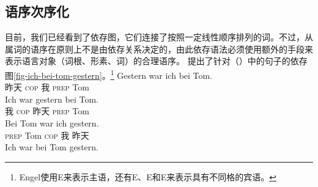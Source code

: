 \subsection{语序次序化}
\label{sec-dg-linearization}

目前，我们已经看到了依存图，它们连接了按照一定线性顺序排列的词。不过，从属词的语序在原则上不是由依存关系决定的，由此依存语法必须使用额外的手段来表示语言对象（词根、形素、词）的合理语序。 \citet[]{Engel2014a}提出了针对（）中的句子的依存图\vref{fig-ich-bei-tom-gestern}。\footnote{%
Engel使用E来表示主语，还有E、E和E来表示具有不同格的宾语。
}
\eal
\label{ex-gestern-war-ich-bei-tom}
\ex 
\gll Gestern war ich bei Tom.\\
     昨天 \textsc{cop} 我 \textsc{prep} Tom\\
\ex 
\gll Ich war gestern bei Tom.\\
     我   \textsc{cop} 昨天 \textsc{prep} Tom\\
\ex 
\gll Bei Tom war ich gestern.\\
     \textsc{prep} Tom  \textsc{cop} 我 昨天\\
\ex 
\gll Ich war bei Tom gestern.\\

